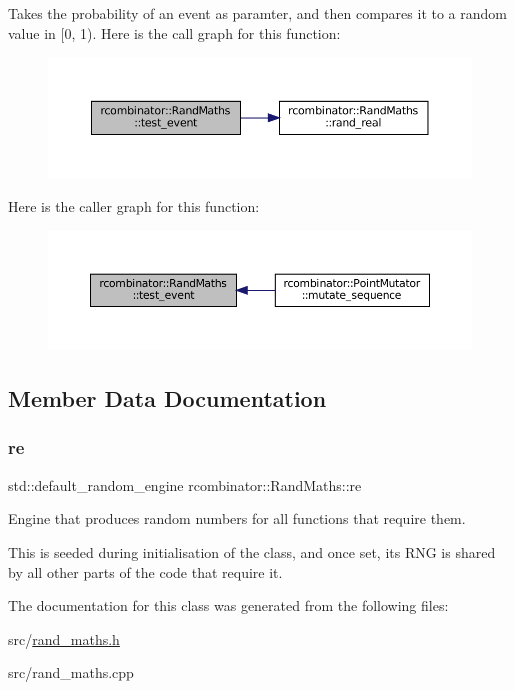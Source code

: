 Takes the probability of an event as paramter, and then compares it to a random value in \mbox{[}0, 1). Here is the call graph for this function\+:
\nopagebreak
\begin{figure}[H]
\begin{center}
\leavevmode
\includegraphics[width=350pt]{classrcombinator_1_1RandMaths_a183686140a9da18ad40c7e048ee8914e_cgraph}
\end{center}
\end{figure}
Here is the caller graph for this function\+:\nopagebreak
\begin{figure}[H]
\begin{center}
\leavevmode
\includegraphics[width=350pt]{classrcombinator_1_1RandMaths_a183686140a9da18ad40c7e048ee8914e_icgraph}
\end{center}
\end{figure}


\subsection{Member Data Documentation}
\mbox{\label{classrcombinator_1_1RandMaths_a69ed49d4f595e927d803d79b0c679ba6}} 
\subsubsection{\texorpdfstring{re}{re}}
{\footnotesize\ttfamily std\+::default\+\_\+random\+\_\+engine rcombinator\+::\+Rand\+Maths\+::re\hspace{0.3cm}{\ttfamily [private]}}



Engine that produces random numbers for all functions that require them. 

This is seeded during initialisation of the class, and once set, its R\+NG is shared by all other parts of the code that require it. 

The documentation for this class was generated from the following files\+:\begin{DoxyCompactItemize}
\item 
src/\mbox{\hyperlink{rand__maths_8h}{rand\+\_\+maths.\+h}}\item 
src/rand\+\_\+maths.\+cpp\end{DoxyCompactItemize}
